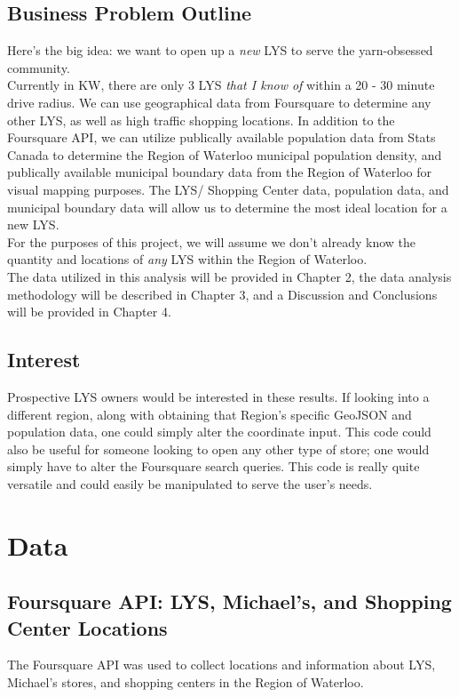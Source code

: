 \documentclass[10pt,a4paper]{report}
\begin{document}
	\section{Business Problem Outline}
	
	Here's the big idea: we want to open up a \textit{new} LYS to serve the yarn-obsessed community.\\
	
	\noindent Currently in KW, there are only 3 LYS \textit{that I know of} within a 20 - 30 minute drive radius. We can use geographical data from Foursquare to determine any other LYS, as well as high traffic shopping locations. In addition to the Foursquare API, we can utilize publically available population data from Stats Canada to determine the Region of Waterloo municipal population density, and publically available municipal boundary data from the Region of Waterloo for visual mapping purposes. The LYS/ Shopping Center data, population data, and municipal boundary data will allow us to determine the most ideal location for a new LYS. \\
	
	\noindent For the purposes of this project, we will assume we don't already know the quantity and locations of \textit{any} LYS within the Region of Waterloo.\\
	
	\noindent The data utilized in this analysis will be provided in Chapter 2, the data analysis methodology will be described in Chapter 3, and a Discussion and Conclusions will be provided in Chapter 4.
	
	
	\section{Interest}
	Prospective LYS owners would be interested in these results. If looking into a different region, along with obtaining that Region's specific GeoJSON and population data, one could simply alter the coordinate input. This code could also be useful for someone looking to open any other type of store; one would simply have to alter the Foursquare search queries. This code is really quite versatile and could easily be manipulated to serve the user's needs.

	\chapter{Data}
	\section{Foursquare API: LYS, Michael's,  and Shopping Center Locations}
	The Foursquare API was used to collect locations and information about LYS, Michael's stores, and shopping centers in the Region of Waterloo. \\
	
\end{document}
